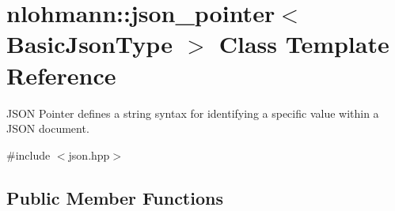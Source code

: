\hypertarget{classnlohmann_1_1json__pointer}{}\section{nlohmann\+:\+:json\+\_\+pointer$<$ Basic\+Json\+Type $>$ Class Template Reference}
\label{classnlohmann_1_1json__pointer}


J\+S\+ON Pointer defines a string syntax for identifying a specific value within a J\+S\+ON document.  




{\ttfamily \#include $<$json.\+hpp$>$}

\subsection*{Public Member Functions}

